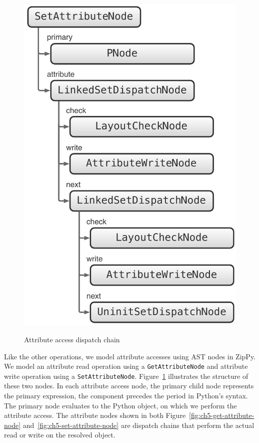 \begin{figure}
{	\includegraphics[scale=.55]{figures/ch5-set-attribute-node}
	\label{fig:ch5-set-attribute-node}
}
\caption{Attribute access dispatch chain}
\label{fig:ch5-attribute-access-dispatch-chain}
\end{figure}

Like the other operations, we model attribute accesses using AST nodes in ZipPy.
We model an attribute read operation using a \texttt{GetAttributeNode} and attribute write operation using a \texttt{SetAttributeNode}.
Figure~\ref{fig:ch5-attribute-access-dispatch-chain} illustrates the structure of these two nodes.
In each attribute access node, the \textsf{primary} child node represents the primary expression, the component precedes the period in Python's syntax.
The \textsf{primary} node evaluates to the Python object, on which we perform the attribute access.
The \textsf{attribute} nodes shown in both Figure~\ref{fig:ch5-get-attribute-node} and~\ref{fig:ch5-set-attribute-node} are dispatch chains that perform the actual read or write on the resolved object.

